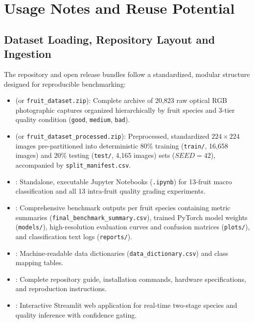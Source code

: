 \documentclass[11pt,a4paper]{article}
\begin{document}
\section{Usage Notes and Reuse Potential}

\subsection{Dataset Loading, Repository Layout and Ingestion}

The repository and open release bundles follow a standardized, modular structure designed for reproducible benchmarking:
\begin{itemize}
    \item {} (or \texttt{fruit\_dataset.zip}): Complete archive of 20,823 raw optical RGB photographic captures organized hierarchically by fruit species and 3-tier quality condition (\texttt{good}, \texttt{medium}, \texttt{bad}).
    \item {} (or \texttt{fruit\_dataset\_processed.zip}): Preprocessed, standardized $224 \times 224$ images pre-partitioned into deterministic 80\% training (\texttt{train/}, 16,658 images) and 20\% testing (\texttt{test/}, 4,165 images) sets ($SEED = 42$), accompanied by \texttt{split\_manifest.csv}.
    \item {}: Standalone, executable Jupyter Notebooks (\texttt{.ipynb}) for 13-fruit macro classification and all 13 intra-fruit quality grading experiments.
    \item {}: Comprehensive benchmark outputs per fruit species containing metric summaries (\texttt{final\_benchmark\_summary.csv}), trained PyTorch model weights (\texttt{models/}), high-resolution evaluation curves and confusion matrices (\texttt{plots/}), and classification text logs (\texttt{reports/}).
    \item {}: Machine-readable data dictionaries (\texttt{data\_dictionary.csv}) and class mapping tables.
    \item {}: Complete repository guide, installation commands, hardware specifications, and reproduction instructions.
    \item {}: Interactive Streamlit web application for real-time two-stage species and quality inference with confidence gating.
\end{itemize}
\end{document}

